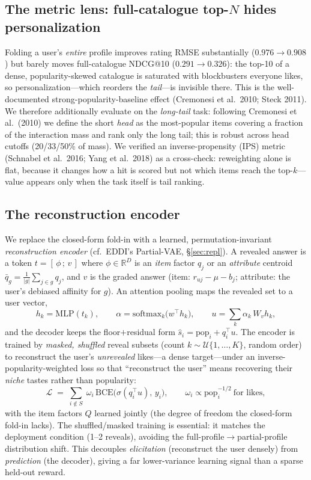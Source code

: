 \documentclass[11pt]{article}
\newcommand{\R}{\mathbb{R}}
\begin{document}
\subsection{The metric lens: full-catalogue top-$N$ hides personalization}
Folding a user's \emph{entire} profile improves rating RMSE substantially ($0.976\!\to\!0.908$) but barely moves
full-catalogue NDCG@10 ($0.291\!\to\!0.326$): the top-10 of a dense, popularity-skewed catalogue is saturated with
blockbusters everyone likes, so personalization---which reorders the \emph{tail}---is invisible there. This is the
well-documented strong-popularity-baseline effect (Cremonesi et al.\ 2010; Steck 2011). We therefore additionally
evaluate on the \emph{long-tail} task: following Cremonesi et al.\ (2010) we define the short \emph{head} as the
most-popular items covering a fraction of the interaction mass and rank only the long tail; this is robust across
head cutoffs (20/33/50\% of mass). We verified an inverse-propensity (IPS) metric (Schnabel et al.\ 2016; Yang et al.\
2018) as a cross-check: reweighting alone is flat, because it changes how a hit is scored but not which items reach
the top-$k$---value appears only when the task itself is tail ranking.

\subsection{The reconstruction encoder}\label{sec:encoder}
We replace the closed-form fold-in with a learned, permutation-invariant \emph{reconstruction encoder} (cf.\ EDDI's
Partial-VAE, \S\ref{sec:repl}). A revealed answer is a token $t = [\,\phi\,;\,v\,]$ where $\phi\in\R^D$ is an
\emph{item} factor $q_j$ or an \emph{attribute} centroid $\bar q_g=\tfrac{1}{|g|}\sum_{j\in g}q_j$, and $v$ is the
graded answer (item: $r_{uj}-\mu-b_j$; attribute: the user's debiased affinity for $g$). An attention pooling maps the
revealed set to a user vector,
\[
h_k=\mathrm{MLP}(t_k),\qquad \alpha=\mathrm{softmax}_k\big(w^\top h_k\big),\qquad u=\sum_k \alpha_k\,W_v h_k,
\]
and the decoder keeps the floor$+$residual form $\hat s_i = \mathrm{pop}_i + q_i^\top u$. The encoder is trained by
\emph{masked, shuffled} reveal subsets (count $k\!\sim\!\mathcal U\{1,\dots,K\}$, random order) to reconstruct the
user's \emph{unrevealed} likes---a dense target---under an inverse-popularity-weighted loss so that ``reconstruct the
user'' means recovering their \emph{niche} tastes rather than popularity:
\[
\mathcal L \;=\; \sum_{i\notin S}\; \omega_i\,\mathrm{BCE}\!\big(\sigma(q_i^\top u),\,y_i\big),\qquad
\omega_i \propto \mathrm{pop}_i^{-1/2}\ \text{for likes},
\]
with the item factors $Q$ learned jointly (the degree of freedom the closed-form fold-in lacks). The shuffled/masked
training is essential: it matches the deployment condition (1--2 reveals), avoiding the full-profile$\to$partial-profile
distribution shift. This decouples \emph{elicitation} (reconstruct the user densely) from \emph{prediction} (the
decoder), giving a far lower-variance learning signal than a sparse held-out reward.
\end{document}
